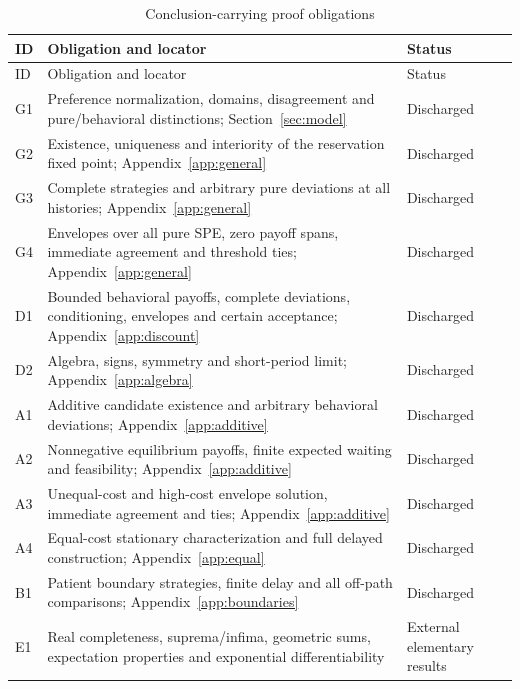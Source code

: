 \documentclass[11pt]{article}
\begin{document}
\begin{longtable}{p{}p{}p{}}
\caption{Conclusion-carrying proof obligations}\label{tab:obligations}\\
\toprule ID & Obligation and locator & Status \\
\midrule\endfirsthead
\toprule ID & Obligation and locator & Status \\
\midrule\endhead
G1 & Preference normalization, domains, disagreement and pure/behavioral distinctions; Section~\ref{sec:model} & Discharged \\
G2 & Existence, uniqueness and interiority of the reservation fixed point; Appendix~\ref{app:general} & Discharged \\
G3 & Complete strategies and arbitrary pure deviations at all histories; Appendix~\ref{app:general} & Discharged \\
G4 & Envelopes over all pure SPE, zero payoff spans, immediate agreement and threshold ties; Appendix~\ref{app:general} & Discharged \\
D1 & Bounded behavioral payoffs, complete deviations, conditioning, envelopes and certain acceptance; Appendix~\ref{app:discount} & Discharged \\
D2 & Algebra, signs, symmetry and short-period limit; Appendix~\ref{app:algebra} & Discharged \\
A1 & Additive candidate existence and arbitrary behavioral deviations; Appendix~\ref{app:additive} & Discharged \\
A2 & Nonnegative equilibrium payoffs, finite expected waiting and feasibility; Appendix~\ref{app:additive} & Discharged \\
A3 & Unequal-cost and high-cost envelope solution, immediate agreement and ties; Appendix~\ref{app:additive} & Discharged \\
A4 & Equal-cost stationary characterization and full delayed construction; Appendix~\ref{app:equal} & Discharged \\
B1 & Patient boundary strategies, finite delay and all off-path comparisons; Appendix~\ref{app:boundaries} & Discharged \\
E1 & Real completeness, suprema/infima, geometric sums, expectation properties and exponential differentiability & External elementary results \\
\bottomrule
\end{longtable}



\end{document}
